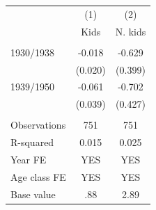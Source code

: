 \begin{tabular}{lcc} \hline
 & (1) & (2) \\
 & Kids & N. kids \\ \hline
 &  &  \\
1930/1938 & -0.018 & -0.629 \\
 & (0.020) & (0.399) \\
1939/1950 & -0.061 & -0.702 \\
 & (0.039) & (0.427) \\
 &  &  \\
Observations & 751 & 751 \\
R-squared & 0.015 & 0.025 \\
Year FE & YES & YES \\
Age class FE & YES & YES \\
 Base value & .88 & 2.89 \\ \hline
\end{tabular}
